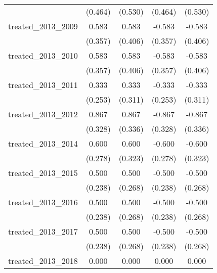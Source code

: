{\begin{tabular}{l*{4}{c}}
            &     (0.464)         &     (0.530)         &     (0.464)         &     (0.530)         \\
[1em]
treated\_2013\_2009&       0.583         &       0.583         &      -0.583         &      -0.583         \\
            &     (0.357)         &     (0.406)         &     (0.357)         &     (0.406)         \\
[1em]
treated\_2013\_2010&       0.583         &       0.583         &      -0.583         &      -0.583         \\
            &     (0.357)         &     (0.406)         &     (0.357)         &     (0.406)         \\
[1em]
treated\_2013\_2011&       0.333         &       0.333         &      -0.333         &      -0.333         \\
            &     (0.253)         &     (0.311)         &     (0.253)         &     (0.311)         \\
[1em]
treated\_2013\_2012&       0.867\sym{**} &       0.867\sym{**} &      -0.867\sym{**} &      -0.867\sym{**} \\
            &     (0.328)         &     (0.336)         &     (0.328)         &     (0.336)         \\
[1em]
treated\_2013\_2014&       0.600\sym{*}  &       0.600         &      -0.600\sym{*}  &      -0.600         \\
            &     (0.278)         &     (0.323)         &     (0.278)         &     (0.323)         \\
[1em]
treated\_2013\_2015&       0.500\sym{*}  &       0.500         &      -0.500\sym{*}  &      -0.500         \\
            &     (0.238)         &     (0.268)         &     (0.238)         &     (0.268)         \\
[1em]
treated\_2013\_2016&       0.500\sym{*}  &       0.500         &      -0.500\sym{*}  &      -0.500         \\
            &     (0.238)         &     (0.268)         &     (0.238)         &     (0.268)         \\
[1em]
treated\_2013\_2017&       0.500\sym{*}  &       0.500         &      -0.500\sym{*}  &      -0.500         \\
            &     (0.238)         &     (0.268)         &     (0.238)         &     (0.268)         \\
[1em]
treated\_2013\_2018&       0.000         &       0.000         &       0.000         &       0.000         \\

\end{tabular}}

